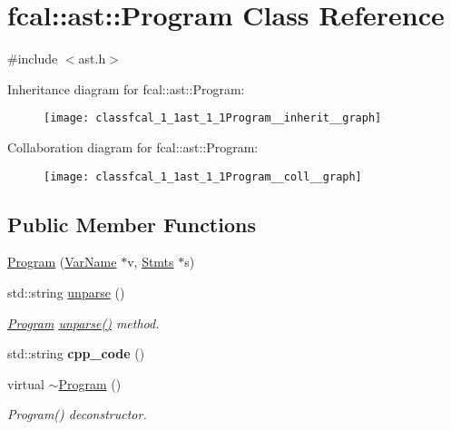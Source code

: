 \hypertarget{classfcal_1_1ast_1_1Program}{}\section{fcal\+:\+:ast\+:\+:Program Class Reference}
\label{classfcal_1_1ast_1_1Program}


{\ttfamily \#include $<$ast.\+h$>$}



Inheritance diagram for fcal\+:\+:ast\+:\+:Program\+:
\nopagebreak
\begin{figure}[H]
\begin{center}
\leavevmode
\texttt{[image: classfcal\_1\_1ast\_1\_1Program\_\_inherit\_\_graph]}
\end{center}
\end{figure}


Collaboration diagram for fcal\+:\+:ast\+:\+:Program\+:
\nopagebreak
\begin{figure}[H]
\begin{center}
\leavevmode
\texttt{[image: classfcal\_1\_1ast\_1\_1Program\_\_coll\_\_graph]}
\end{center}
\end{figure}
\subsection*{Public Member Functions}
\begin{DoxyCompactItemize}
\item 
\hyperlink{classfcal_1_1ast_1_1Program_a317855d9155276333e1b47794d7b7305}{Program} (\hyperlink{classfcal_1_1ast_1_1VarName}{Var\+Name} $\ast$v, \hyperlink{classfcal_1_1ast_1_1Stmts}{Stmts} $\ast$s)
\item 
std\+::string \hyperlink{classfcal_1_1ast_1_1Program_a74fbea2311a77a1e53104350d50705a6}{unparse} ()
\begin{DoxyCompactList}\small\item\em \hyperlink{classfcal_1_1ast_1_1Program}{Program} \hyperlink{classfcal_1_1ast_1_1Program_a74fbea2311a77a1e53104350d50705a6}{unparse()} method. \end{DoxyCompactList}\item 
std\+::string {\bfseries cpp\+\_\+code} ()\hypertarget{classfcal_1_1ast_1_1Program_a1a3acfb2ff26b7d0cc90b11558214acd}{}\label{classfcal_1_1ast_1_1Program_a1a3acfb2ff26b7d0cc90b11558214acd}

\item 
virtual \hyperlink{classfcal_1_1ast_1_1Program_ace5f7fd3776c0620648d876b593d3acc}{$\sim$\+Program} ()
\begin{DoxyCompactList}\small\item\em Program() deconstructor. \end{DoxyCompactList}\end{DoxyCompactItemize}



